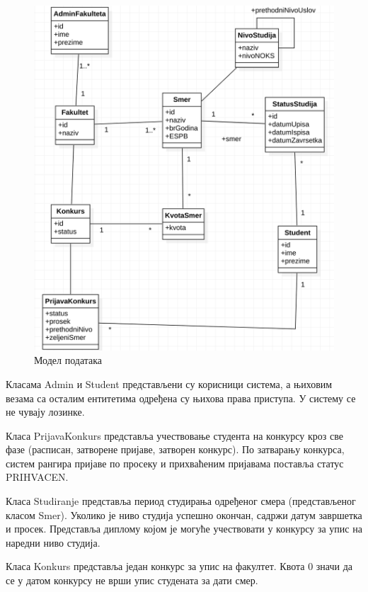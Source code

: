 \documentclass[a4paper]{article}
\begin{document}
\begin{figure}[H]
    \centering
    \includegraphics{images/class_diagram.png}
    \caption{Модел података}
    \label{fig:class_diagram}
\end{figure}

Класама Admin и Student представљени су корисници система, а њиховим везама са осталим ентитетима одређена су њихова права приступа. У систему се не чувају лозинке.

Класа PrijavaKonkurs представља учествовање студента на конкурсу кроз све фазе (расписан, затворене пријаве, затворен конкурс).
По затварању конкурса, систем рангира пријаве по просеку и прихваћеним пријавама поставља статус PRIHVACEN.

Класа Studiranje представља период студирања одређеног смера (представљеног класом Smer). Уколико је ниво студија
успешно окончан, садржи датум завршетка и просек. Представља диплому којом је могуће учествовати у конкурсу за упис
на наредни ниво студија.

Класа Konkurs представља један конкурс за упис на факултет. Квота 0 значи да се у датом конкурсу не врши упис студената за дати смер.
\end{document}
